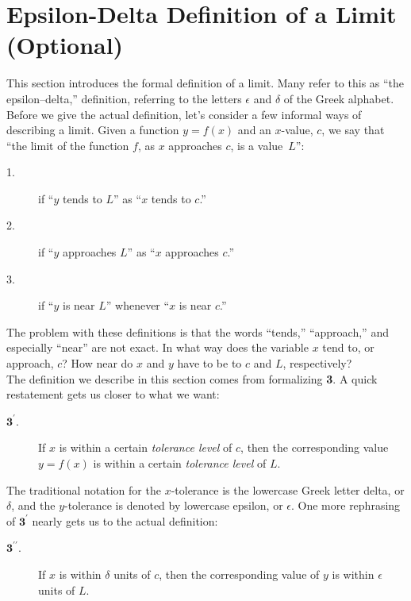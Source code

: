 
\section{Epsilon-Delta Definition of a Limit (Optional)}\label{sec:limit_def}

This section introduces the formal definition of a limit. Many refer to this as ``the epsilon--delta,'' definition, referring to the letters $\epsilon$ and $\delta$ of the Greek alphabet.\\

Before we give the actual definition, let's consider a few informal ways of describing a limit.  Given a function $y=f(x)$ and an $x$-value, $c$, we say that ``the limit of the function $f$, as $x$ approaches $c$, is a value~$L$'': 

\begin{description}
\item[1.]if ``$y$ tends to $L$'' as ``$x$ tends to $c$.''
\item[2.]if ``$y$ approaches $L$'' as ``$x$ approaches $c$.''
\item[3.]if ``$y$ is near $L$'' whenever ``$x$ is near $c$.''
\end{description}

The problem with these definitions is that the words ``tends,'' ``approach,'' and especially ``near'' are not exact.  In what way does the variable $x$ tend to, or approach, $c$? How near do $x$ and $y$ have to be to $c$ and $L$, respectively?  \\

The definition we describe in this section comes from formalizing {\bf 3}.  A quick restatement gets us closer to what we want:

\begin{description}
\item[$\textbf{3}^\prime$.]If $x$ is within a certain \textit{tolerance level} of $c$, then the corresponding value $y=f(x)$ is within a certain \textit{tolerance level} of $L$.
\end{description}

The traditional notation for the $x$-tolerance is the lowercase Greek letter delta, or $\delta$, and the $y$-tolerance is denoted by lowercase epsilon, or $\epsilon$. One more rephrasing of $\textbf{3}^\prime$ nearly gets us to the actual definition:

\begin{description}
\item[$\textbf{3}^{\prime \prime}$.]If $x$ is within $\delta$ units of $c$, then the corresponding value of $y$ is within $\epsilon$ units of $L$.
\end{description}

